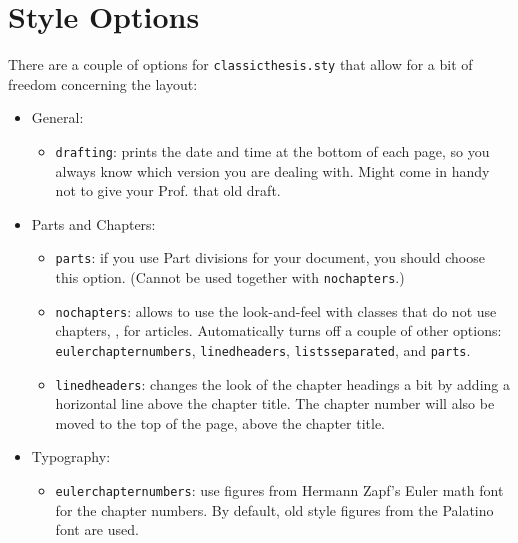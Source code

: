 \section{Style Options}\label{sec:options}
There are a couple of options for \texttt{classicthesis.sty} that
allow for a bit of freedom concerning the layout:
\begin{itemize}
    \item General:
        \begin{itemize}
            \item\texttt{drafting}: prints the date and time at the bottom of
            each page, so you always know which version you are dealing with.
            Might come in handy not to give your Prof. that old draft.
        \end{itemize}

    \item Parts and Chapters:
        \begin{itemize}
            \item\texttt{parts}: if you use Part divisions for your document,
            you should choose this option. (Cannot be used together with
            \texttt{nochapters}.)

            \item\texttt{nochapters}: allows to use the look-and-feel with
            classes that do not use chapters, \eg, for articles. Automatically
            turns off a couple of other options: \texttt{eulerchapternumbers},
            \texttt{linedheaders}, \texttt{listsseparated}, and \texttt{parts}.

            \item\texttt{linedheaders}: changes the look of the chapter
            headings a bit by adding a horizontal line above the chapter
            title. The chapter number will also be moved to the top of the
            page, above the chapter title.

        \end{itemize}

    \item Typography:
        \begin{itemize}
            \item\texttt{eulerchapternumbers}: use figures from Hermann Zapf's
            Euler math font for the chapter numbers. By default, old style
            figures from the Palatino font are used.


\end{itemize}
\end{itemize}
